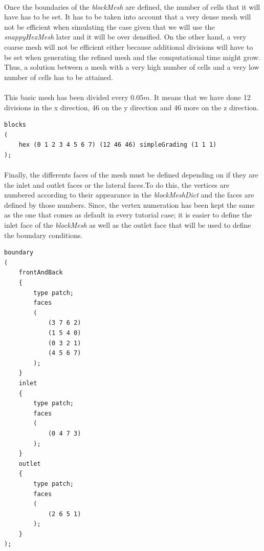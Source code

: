 \paragraph{}Once the boundaries of the \textit{blockMesh} are defined, the number of cells that it will have has to be set. It has to be taken into account that a very dense mesh will not be efficient when simulating the case given that we will use the \textit{snappyHexMesh} later and it will be over densified. On the other hand, a very coarse mesh will not be efficient either because additional divisions will have to be set when generating the refined mesh and the computational time might grow. Thus, a solution between a mesh with a very high number of cells and a very low number of cells has to be attained.

\paragraph{}This basic mesh has been divided every $0.05m$. It means that we have done 12 divisions in the x direction, 46 on the y direction and 46 more on the z direction. 

\begin{footnotesize}
\begin{verbatim}
blocks
(
    hex (0 1 2 3 4 5 6 7) (12 46 46) simpleGrading (1 1 1)
);
\end{verbatim}
\end{footnotesize}

\paragraph{}Finally, the differents faces of the mesh must be defined depending on if they are the inlet and outlet faces or the lateral faces.To do this, the vertices are numbered according to their appearance in the \textit{blockMeshDict} and the faces are defined by those numbers. Since, the vertex numeration has been kept the same as the one that comes as default in every tutorial case; it is easier to define the inlet face of the \textit{blockMesh} as well as the outlet face that will be used to define the boundary conditions.

\begin{footnotesize}
\begin{verbatim}
boundary
(
    frontAndBack
    {
        type patch;
        faces
        (
            (3 7 6 2)
            (1 5 4 0)
            (0 3 2 1)
            (4 5 6 7)
        );
    }
    inlet
    {
        type patch;
        faces
        (
            (0 4 7 3)
        );
    }
    outlet
    {
        type patch;
        faces
        (
            (2 6 5 1)
        );
    }
);
\end{verbatim}
\end{footnotesize}


